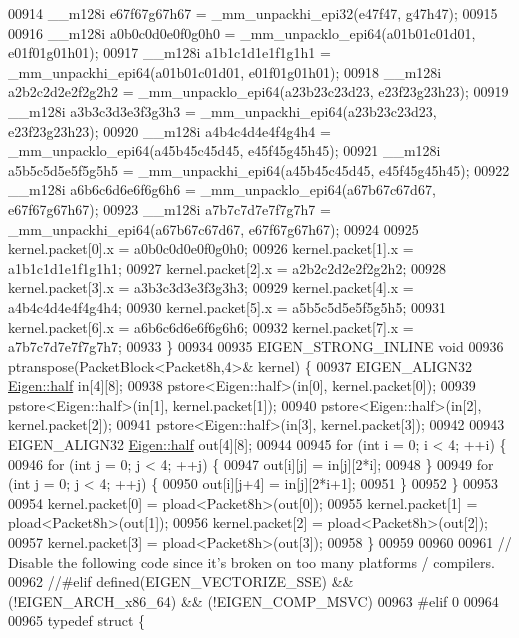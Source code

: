 \begin{DoxyCode}
00914   \_\_m128i e67f67g67h67 = \_mm\_unpackhi\_epi32(e47f47, g47h47);
00915 
00916   \_\_m128i a0b0c0d0e0f0g0h0 = \_mm\_unpacklo\_epi64(a01b01c01d01, e01f01g01h01);
00917   \_\_m128i a1b1c1d1e1f1g1h1 = \_mm\_unpackhi\_epi64(a01b01c01d01, e01f01g01h01);
00918   \_\_m128i a2b2c2d2e2f2g2h2 = \_mm\_unpacklo\_epi64(a23b23c23d23, e23f23g23h23);
00919   \_\_m128i a3b3c3d3e3f3g3h3 = \_mm\_unpackhi\_epi64(a23b23c23d23, e23f23g23h23);
00920   \_\_m128i a4b4c4d4e4f4g4h4 = \_mm\_unpacklo\_epi64(a45b45c45d45, e45f45g45h45);
00921   \_\_m128i a5b5c5d5e5f5g5h5 = \_mm\_unpackhi\_epi64(a45b45c45d45, e45f45g45h45);
00922   \_\_m128i a6b6c6d6e6f6g6h6 = \_mm\_unpacklo\_epi64(a67b67c67d67, e67f67g67h67);
00923   \_\_m128i a7b7c7d7e7f7g7h7 = \_mm\_unpackhi\_epi64(a67b67c67d67, e67f67g67h67);
00924 
00925   kernel.packet[0].x = a0b0c0d0e0f0g0h0;
00926   kernel.packet[1].x = a1b1c1d1e1f1g1h1;
00927   kernel.packet[2].x = a2b2c2d2e2f2g2h2;
00928   kernel.packet[3].x = a3b3c3d3e3f3g3h3;
00929   kernel.packet[4].x = a4b4c4d4e4f4g4h4;
00930   kernel.packet[5].x = a5b5c5d5e5f5g5h5;
00931   kernel.packet[6].x = a6b6c6d6e6f6g6h6;
00932   kernel.packet[7].x = a7b7c7d7e7f7g7h7;
00933 \}
00934 
00935 EIGEN\_STRONG\_INLINE \textcolor{keywordtype}{void}
00936 ptranspose(PacketBlock<Packet8h,4>& kernel) \{
00937   EIGEN\_ALIGN32 \hyperlink{struct_eigen_1_1half}{Eigen::half} in[4][8];
00938   pstore<Eigen::half>(in[0], kernel.packet[0]);
00939   pstore<Eigen::half>(in[1], kernel.packet[1]);
00940   pstore<Eigen::half>(in[2], kernel.packet[2]);
00941   pstore<Eigen::half>(in[3], kernel.packet[3]);
00942 
00943   EIGEN\_ALIGN32 \hyperlink{struct_eigen_1_1half}{Eigen::half} out[4][8];
00944 
00945   \textcolor{keywordflow}{for} (\textcolor{keywordtype}{int} i = 0; i < 4; ++i) \{
00946     \textcolor{keywordflow}{for} (\textcolor{keywordtype}{int} j = 0; j < 4; ++j) \{
00947       out[i][j] = in[j][2*i];
00948     \}
00949     \textcolor{keywordflow}{for} (\textcolor{keywordtype}{int} j = 0; j < 4; ++j) \{
00950       out[i][j+4] = in[j][2*i+1];
00951     \}
00952   \}
00953 
00954   kernel.packet[0] = pload<Packet8h>(out[0]);
00955   kernel.packet[1] = pload<Packet8h>(out[1]);
00956   kernel.packet[2] = pload<Packet8h>(out[2]);
00957   kernel.packet[3] = pload<Packet8h>(out[3]);
00958 \}
00959 
00960 
00961 \textcolor{comment}{// Disable the following code since it's broken on too many platforms / compilers.}
00962 \textcolor{comment}{//#elif defined(EIGEN\_VECTORIZE\_SSE) && (!EIGEN\_ARCH\_x86\_64) && (!EIGEN\_COMP\_MSVC)}
00963 \textcolor{preprocessor}{#elif 0}
00964 
00965 \textcolor{keyword}{typedef} \textcolor{keyword}{struct }\{

\end{DoxyCode}
